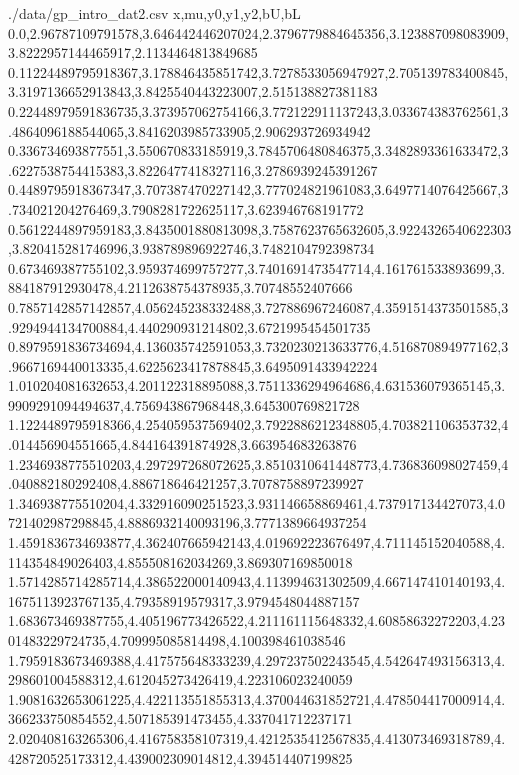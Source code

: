 \begin{filecontents*}{./data/gp_intro_dat2.csv}
    x,mu,y0,y1,y2,bU,bL
    0.0,2.96787109791578,3.646442446207024,2.3796779884645356,3.123887098083909,3.8222957144465917,2.1134464813849685
    0.11224489795918367,3.178846435851742,3.7278533056947927,2.705139783400845,3.3197136652913843,3.8425540443223007,2.515138827381183
    0.22448979591836735,3.373957062754166,3.772122911137243,3.033674383762561,3.4864096188544065,3.8416203985733905,2.906293726934942
    0.336734693877551,3.550670833185919,3.7845706480846375,3.3482893361633472,3.6227538754415383,3.8226477418327116,3.2786939245391267
    0.4489795918367347,3.707387470227142,3.777024821961083,3.6497714076425667,3.734021204276469,3.7908281722625117,3.623946768191772
    0.5612244897959183,3.8435001880813098,3.7587623765632605,3.9224326540622303,3.820415281746996,3.938789896922746,3.7482104792398734
    0.673469387755102,3.959374699757277,3.7401691473547714,4.161761533893699,3.884187912930478,4.2112638754378935,3.70748552407666
    0.7857142857142857,4.056245238332488,3.727886967246087,4.3591514373501585,3.9294944134700884,4.440290931214802,3.6721995454501735
    0.8979591836734694,4.136035742591053,3.7320230213633776,4.516870894977162,3.9667169440013335,4.6225623417878845,3.6495091433942224
    1.010204081632653,4.201122318895088,3.7511336294964686,4.631536079365145,3.9909291094494637,4.756943867968448,3.645300769821728
    1.1224489795918366,4.254059537569402,3.7922886212348805,4.703821106353732,4.014456904551665,4.844164391874928,3.663954683263876
    1.2346938775510203,4.297297268072625,3.8510310641448773,4.736836098027459,4.040882180292408,4.886718646421257,3.7078758897239927
    1.346938775510204,4.332916090251523,3.931146658869461,4.737917134427073,4.0721402987298845,4.8886932140093196,3.7771389664937254
    1.4591836734693877,4.362407665942143,4.019692223676497,4.711145152040588,4.114354849026403,4.855508162034269,3.869307169850018
    1.5714285714285714,4.386522000140943,4.113994631302509,4.667147410140193,4.1675113923767135,4.79358919579317,3.9794548044887157
    1.683673469387755,4.405196773426522,4.211161115648332,4.60858632272203,4.2301483229724735,4.709995085814498,4.100398461038546
    1.7959183673469388,4.417575648333239,4.297237502243545,4.542647493156313,4.298601004588312,4.612045273426419,4.223106023240059
    1.9081632653061225,4.422113551855313,4.370044631852721,4.478504417000914,4.366233750854552,4.507185391473455,4.337041712237171
    2.020408163265306,4.416758358107319,4.4212535412567835,4.413073469318789,4.428720525173312,4.439002309014812,4.394514407199825

\end{filecontents*}
